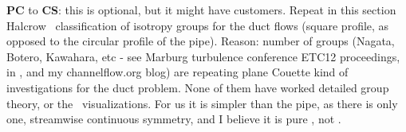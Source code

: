 		 {\label{exer:pathsDuct}
{\bf PC} to {\bf CS}:
 this is optional, but it might have customers. Repeat
in this section Halcrow \etal\ classification of isotropy
groups for the duct flows (square profile, as opposed to the
circular profile of the pipe). Reason: number of groups
(Nagata, Botero, Kawahara, etc - see Marburg turbulence
conference ETC12 proceedings, in ,
and my
      {channelflow.org blog})
are repeating plane Couette kind of investigations for the duct
problem. None of them have worked detailed group theory, or the
\statesp\ visualizations. For us it is simpler than the pipe,
as there is only one, streamwise continuous symmetry, and I
believe it is pure , not .
    } %
